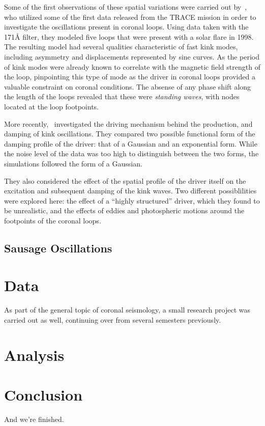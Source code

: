 \documentclass[preprint2]{aastex}
\begin{document}
Some of the first observations of these spatial variations
were carried out by~\cite{kink_1},
who utilized some of the first data released from the TRACE mission in
order to investigate the oscillations present in coronal loops.
Using data taken with the 171\AA{} filter, they modeled five loops that
were present with a solar flare in 1998.
The resulting model had several qualities characteristic of
fast kink modes, including asymmetry
and
displacements represented by sine curves.
As the period of kink modes were already known to correlate
with the magnetic field strength of the loop, pinpointing this
type of mode as the driver in coronal loops provided a valuable
constraint on coronal conditions.
The absense of any phase
shift along the length of the loops revealed that these were
\emph{standing waves}, with nodes located at the loop footpoints.

More recently,~\cite{kink_2} investigated the driving mechanism
behind the production, and damping of kink oscillations.
They compared two possible functional form of the damping profile
of the driver: that of a Gaussian and an exponential form.
While the noise level of the data was too high to distinguish
between the two forms, the simulations followed the form of a
Gaussian.

They also considered the effect of the spatial profile of the driver
itself on the excitation and subsequent damping of the kink
waves. Two different possiblilities were explored here:
the effect of a ``highly structured'' driver, which they
found to be unrealistic, and the effects of eddies and photospheric
motions around the footpoints of the coronal loops.



\subsection{Sausage Oscillations}


\section{Data}\label{data}
As part of the general topic of coronal seismology,
a small research project was carried out as well, continuing
over from several semesters previously.

\section{Analysis}\label{analysis}

\section{Conclusion}\label{conclusion}
And we're finished.


\end{document}
